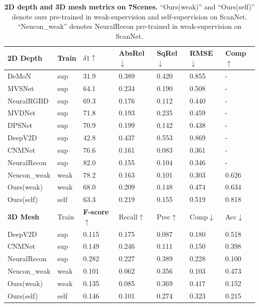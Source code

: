 \begin{table}[]
\footnotesize
\setlength\tabcolsep{2pt}
\begin{tabular}{lllllll}
\hline
\textbf{2D Depth}        & Train    & \textbf{$\delta1\uparrow$}     & AbsRel$\downarrow$ & SqRel$\downarrow$ & RMSE$\downarrow$ & Comp$\uparrow$\\ \hline
DeMoN\cite{demon}   & sup   & 31.9 & 0.389 & 0.420  & 0.855 & -    \\ 
MVSNet\cite{mvsnet}   & sup  & 64.1 & 0.234 & 0.190  & 0.508 & -    \\ 
NeuralRGBD\cite{neuralrgb}   & sup      & 69.3 & 0.176 & 0.112  & 0.440 & -    \\ 
MVDNet\cite{mvdepthnet}   & sup     & 71.8 & 0.193 & 0.235  & 0.459 & -    \\ 
DPSNet\cite{dpsnet}   & sup      & 70.9 & 0.199 & 0.142  & 0.438 & -    \\ 
DeepV2D\cite{deepv2d}     & sup        & 42.8  & 0.437 & 0.553  & 0.869 & -   \\
CNMNet\cite{CNMNet}          & sup         & 76.6 & 0.161 & 0.083  & 0.361 & -   \\
NeuralRecon\cite{neucon}    & sup         & 82.0 & 0.155 & 0.104  & 0.346 & -   \\
Neucon\_weak\cite{neucon}    & weak         & 78.2 & 0.163 & 0.101  & 0.303 & 0.626   \\
Ours(weak)   & weak                   & 68.0 & 0.209 & 0.148  & 0.474 & 0.634    \\ 
Ours(self)   & self                   & 63.3 & 0.219 & 0.155  & 0.519 & 0.818    \\ \hline
\textbf{3D Mesh}         & Train        & \textbf{F-score$\uparrow$}  & Recall$\uparrow$ & Prec$\uparrow$  &  Comp$\downarrow$ & Acc$\downarrow$\\ \hline
DeepV2D\cite{deepv2d}     & sup        & 0.115 & 0.175 & 0.087  & 0.180 & 0.518   \\
CNMNet\cite{CNMNet}          & sup         & 0.149 & 0.246 & 0.111  & 0.150 & 0.398   \\
NeuralRecon\cite{neucon}    & sup         & 0.282 & 0.227 & 0.389  & 0.228 & 0.100   \\
Neucon\_weak\cite{neucon}    & weak         & 0.101 & 0.062 & 0.356  & 0.103 & 0.473   \\
Ours(weak)    & weak         & 0.135 & 0.085 & 0.369  & 0.417 & 0.152   \\
Ours(self)    & self         & 0.146 & 0.101 & 0.274  & 0.323 & 0.215   \\
\hline
\end{tabular}
\vspace{-3mm}
\caption{\textbf{2D depth and 3D mesh metrics on 7Scenes.} ``Ours(weak)'' and ``Ours(self)'' denote ours pre-trained in weak-supervision and self-supervision on ScanNet. ``Neucon\_weak'' denotes NeuralRecon pre-trained in weak-supervision on ScanNet.
}
\label{table:7scenes}
\vspace{-6mm}
\end{table}

